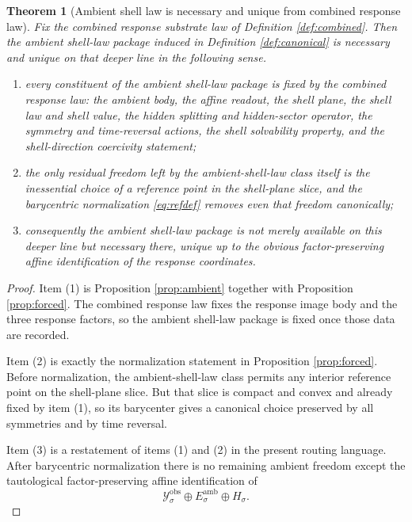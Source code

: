 \documentclass[11pt]{article}
\newcommand{\DataSpace}[1]{\mathcal Y_{#1}^{\mathrm{obs}}}
\newcommand{\AmbientTarget}[1]{E_{#1}^{\mathrm{amb}}}
\newcommand{\GapSpace}[1]{H_{#1}}
\newtheorem{theorem}{Theorem}
\begin{document}
\begin{theorem}[Ambient shell law is necessary and unique from combined response law]
\label{thm:necessity}
Fix the combined response substrate law of Definition \ref{def:combined}. Then the ambient shell-law package induced in Definition \ref{def:canonical} is necessary and unique on that deeper line in the following sense.
\begin{enumerate}
    \item every constituent of the ambient shell-law package is fixed by the combined response law: the ambient body, the affine readout, the shell plane, the shell law and shell value, the hidden splitting and hidden-sector operator, the symmetry and time-reversal actions, the shell solvability property, and the shell-direction coercivity statement;
    \item the only residual freedom left by the ambient-shell-law class itself is the inessential choice of a reference point in the shell-plane slice, and the barycentric normalization \eqref{eq:refdef} removes even that freedom canonically;
    \item consequently the ambient shell-law package is not merely available on this deeper line but necessary there, unique up to the obvious factor-preserving affine identification of the response coordinates.
\end{enumerate}
\end{theorem}

\begin{proof}
Item (1) is Proposition \ref{prop:ambient} together with Proposition \ref{prop:forced}. The combined response law fixes the response image body and the three response factors, so the ambient shell-law package is fixed once those data are recorded.

Item (2) is exactly the normalization statement in Proposition \ref{prop:forced}. Before normalization, the ambient-shell-law class permits any interior reference point on the shell-plane slice. But that slice is compact and convex and already fixed by item (1), so its barycenter gives a canonical choice preserved by all symmetries and by time reversal.

Item (3) is a restatement of items (1) and (2) in the present routing language. After barycentric normalization there is no remaining ambient freedom except the tautological factor-preserving affine identification of
\[
\DataSpace{\sigma}\oplus \AmbientTarget{\sigma}\oplus \GapSpace{\sigma}.
\]
\end{proof}
\end{document}
